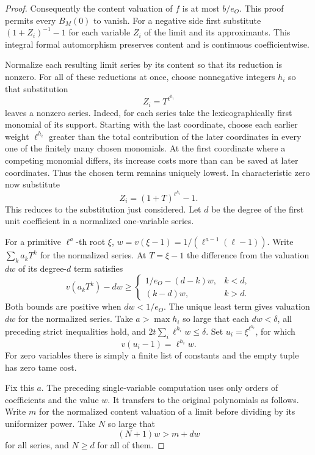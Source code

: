 \begin{proof}
Consequently the content valuation of \(f\) is at most
\(b/e_O\). This proof permits every \(B_M(0)\) to vanish.
For a negative side first substitute \((1+Z_i)^{-1}-1\) for
each variable \(Z_i\) of the limit and its approximants.
This integral formal automorphism preserves content and is
continuous coefficientwise.

Normalize each resulting limit series by its content so that
its reduction is nonzero. For all of these reductions at once,
choose nonnegative integers \(h_i\) so that substitution
\[
 Z_i=T^{\ell^{h_i}}
\]
leaves a nonzero series. Indeed, for
each series take the lexicographically first monomial of its
support. Starting with the last coordinate, choose each earlier
weight \(\ell^{h_i}\) greater than the total contribution of
the later coordinates in every one of the finitely many chosen
monomials. At the first coordinate where a competing monomial
differs, its increase costs more than can be saved at later
coordinates. Thus the chosen term remains uniquely lowest.
In characteristic zero now substitute
\[
          Z_i=(1+T)^{\ell^{h_i}}-1 .
\]
This reduces to the substitution just considered. Let \(d\)
be the degree of the first unit coefficient in a normalized
one-variable series.

For a primitive \(\ell^a\)-th root
\(\xi\), \(w=v(\xi-1)=1/(\ell^{a-1}(\ell-1))\).
Write \(\sum_k a_k T^k\) for the normalized series.
At \(T=\xi-1\) the difference from the valuation \(dw\)
of its degree-\(d\) term satisfies
\[
 v(a_kT^k)-dw\ge
 \begin{cases}
       1/e_O-(d-k)w,&k<d,\\
       (k-d)w,&k>d.
 \end{cases}
\]
Both bounds are positive when \(dw<1/e_O\). The unique
least term gives valuation \(dw\) for the normalized
series. Take \(a>\max h_i\) so large that
each \(dw<\delta\), all preceding strict inequalities hold,
and \(2t\sum_i\ell^{h_i}w\le\delta\).
Set \(u_i=\xi^{\ell^{h_i}}\), for which
\[
 v(u_i-1)=\ell^{h_i}w.
\]
For zero variables there is simply a
finite list of constants and the empty tuple has zero tame cost.

Fix this \(a\). The preceding single-variable computation uses
only orders of coefficients and the value \(w\). It transfers to
the original polynomials as follows. Write \(m\) for the
normalized content valuation of a limit before dividing by its
uniformizer power. Take \(N\) so large that
\[
 (N+1)w>m+dw
\]
for all series, and \(N\ge d\) for all of
them.


\end{proof}
